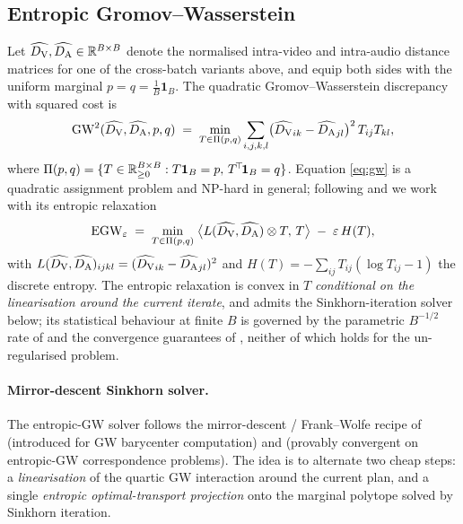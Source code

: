 \subsection{Entropic Gromov--Wasserstein}
\label{sec:methodology:egw}

Let $\widehat{D_{\mathrm{V}}}, \widehat{D_{\mathrm{A}}} \in \mathbb{R}^{B \times B}$ denote the
normalised intra-video and intra-audio distance matrices for one of
the cross-batch variants above, and equip both sides with the
uniform marginal
$p = q = \tfrac{1}{B}\mathbf{1}_B$. The quadratic
Gromov--Wasserstein discrepancy with squared cost is
\begin{equation}
  \mathrm{GW}^{2}(\widehat{D_{\mathrm{V}}}, \widehat{D_{\mathrm{A}}}, p, q)
  \;=\;
  \min_{T \in \Pi(p,q)}
  \sum_{i,j,k,l}
  \bigl(\widehat{D_{\mathrm{V}}}_{ik} - \widehat{D_{\mathrm{A}}}_{jl}\bigr)^{2}
  \, T_{ij} T_{kl},
  \label{eq:gw}
\end{equation}
where $\Pi(p,q) = \{T \in \mathbb{R}_{\geq 0}^{B \times B} :
T \mathbf{1}_B = p,\, T^{\!\top}\!\mathbf{1}_B = q\}$. Equation
\eqref{eq:gw} is a quadratic assignment problem and NP-hard in
general; following \citet{peyre_2016_gromov} and
\citet{solomon_2016_entropic} we work with its entropic relaxation
\begin{equation}
  \mathrm{EGW}_\varepsilon
  \;=\;
  \min_{T \in \Pi(p,q)}
  \;\bigl\langle L(\widehat{D_{\mathrm{V}}}, \widehat{D_{\mathrm{A}}}) \otimes T,\, T\bigr\rangle
  \;-\; \varepsilon\, H(T),
  \label{eq:egw}
\end{equation}
with $L(\widehat{D_{\mathrm{V}}}, \widehat{D_{\mathrm{A}}})_{ijkl} = (\widehat{D_{\mathrm{V}}}_{ik} -
\widehat{D_{\mathrm{A}}}_{jl})^{2}$ and $H(T) = -\sum_{ij} T_{ij}(\log T_{ij} -
1)$ the discrete entropy. The entropic relaxation is convex in $T$
\emph{conditional on the linearisation around the current iterate},
and admits the Sinkhorn-iteration solver below; its statistical
behaviour at finite $B$ is governed by the parametric
$B^{-1/2}$ rate of \citet{zhang_2024_gromov} and the convergence
guarantees of \citet{rioux_2023_entropic}, neither of which holds
for the un-regularised problem.

\paragraph{Mirror-descent Sinkhorn solver.}
The entropic-GW solver follows the mirror-descent / Frank--Wolfe
recipe of \citet{peyre_2016_gromov} (introduced for GW barycenter
computation) and \citet{solomon_2016_entropic} (provably
convergent on entropic-GW correspondence problems). The idea is
to alternate two cheap steps: a \emph{linearisation} of the
quartic GW interaction around the current plan, and a single
\emph{entropic optimal-transport projection} onto the marginal
polytope solved by Sinkhorn iteration.

